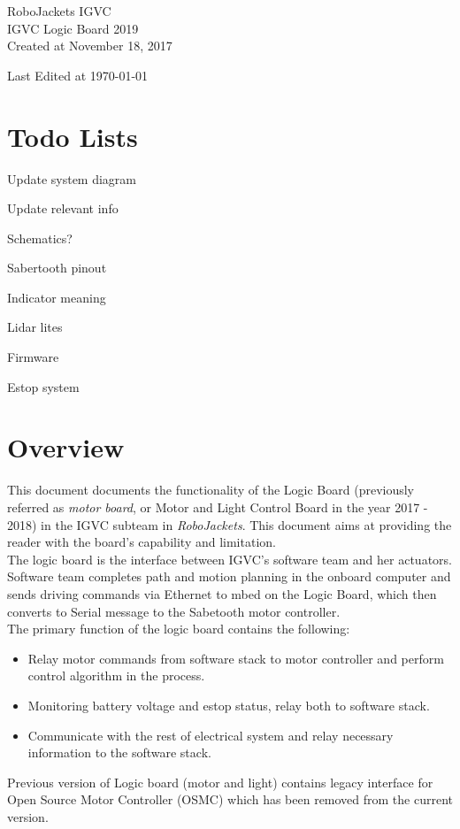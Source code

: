 \documentclass[letterpaper, 12pt]{article}
\newcommand{\cmark}{\ding{51}}%
\newcommand{\done}{\rlap{$\square$}{\raisebox{2pt}{\large\hspace{1pt}\cmark}}%
\hspace{-2.5pt}}
\begin{document}
\begin{titlepage}
\centering
	{\LARGE RoboJackets IGVC}\\
	\vspace{1cm}
	{\Large IGVC Logic Board 2019}\\
	\vfill
	{\large Created at November 18, 2017}\\
	\vspace{1cm}
	{\large Last Edited at \today\par}
\end{titlepage}

\tableofcontents

\pagebreak
\section*{Todo Lists}
\begin{todolist}
  \item[\done] Update system diagram
  \item[\done] Update relevant info
  \item Schematics?
  \item[\done] Sabertooth pinout
  \item[\done] Indicator meaning
  \item Lidar lites
  \item Firmware
  \item[\done] Estop system
\end{todolist}

\pagebreak

\section{Overview}
This document documents the functionality of the Logic Board (previously referred as \emph{motor board},
or Motor and Light Control Board in the year 2017 - 2018) in the IGVC subteam in \emph{RoboJackets}.
This document aims at providing the reader with the board's capability and limitation. \vspace{6pt}\\
The logic board is the interface between IGVC's software team and her actuators. Software team completes
path and motion planning in the onboard computer and sends driving commands via Ethernet to mbed on the Logic
Board, which then converts to Serial message to the Sabetooth motor controller.\\


The primary function of the logic board contains the following:
\begin{itemize}
    \item Relay motor commands from software stack to motor controller and perform control algorithm in the process.
    \item Monitoring battery voltage and estop status, relay both to software stack.
    \item Communicate with the rest of electrical system and relay necessary information to the software stack.
\end{itemize}
Previous version of Logic board (motor and light) contains legacy interface for Open Source Motor Controller (OSMC)
which has been removed from the current version.
\end{document}
